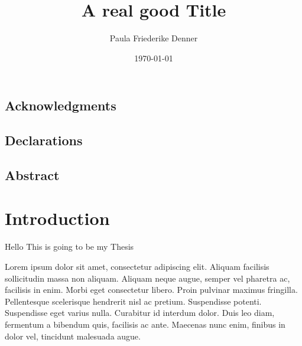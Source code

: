 \documentclass[a4paper, 11pt]{report}
\date{\today}
\author{Paula Friederike Denner}
\title{A real good Title}
\begin{document}
\thesiscopyrightpage

\thesistitlepage




\pagestyle{plain}


\tableofcontents{}


\listoffigures{}


\listoftables{}

\clearpage

\section*{Acknowledgments}


\clearpage

\section*{Declarations}


\clearpage
\null\vfill

{\centering
\section*{Abstract}
}


\vfill\vfill
\clearpage



\chapter{Introduction}


Hello This is going to be my Thesis\cite{aBook}

Lorem ipsum dolor sit amet, consectetur adipiscing elit. Aliquam facilisis sollicitudin massa non aliquam. Aliquam neque augue, semper vel pharetra ac, facilisis in enim. Morbi eget consectetur libero. Proin pulvinar maximus fringilla. Pellentesque scelerisque hendrerit nisl ac pretium. Suspendisse potenti. Suspendisse eget varius nulla. Curabitur id interdum dolor. Duis leo diam, fermentum a bibendum quis, facilisis ac ante. Maecenas nunc enim, finibus in dolor vel, tincidunt malesuada augue.
\end{document}
